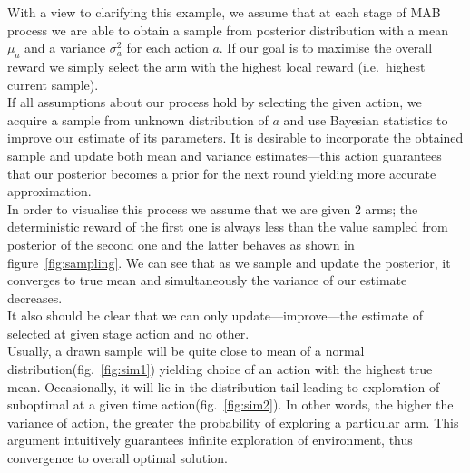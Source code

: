 \documentclass[12pt, a4paper, pdflatex, leqno, twoside]{report}
\begin{document}
With a view to clarifying this example, we assume that at each stage of MAB process we are able to 
obtain a sample from posterior distribution with a mean $\mu_a$ and a variance 
$\sigma^2_a$ for each action $a$. If our goal is to maximise the overall reward we simply 
select the arm with the highest local reward (i.e.\ highest current sample).\\

If all assumptions 
about our process hold by selecting the given action, we acquire a sample from unknown distribution of $a$ and use Bayesian statistics to improve our estimate of its 
parameters. It is desirable to incorporate the obtained sample and update both mean and 
variance estimates---this action guarantees that our posterior becomes a prior for the next round yielding more accurate approximation.\\

In order to visualise this process we assume that we are given 2 arms; the deterministic reward of the
first one is always less than the value sampled from posterior of the second one and the latter behaves as shown 
in figure~\ref{fig:sampling}. We can see that as we sample and update the 
posterior, it converges to true mean and simultaneously the variance of our 
estimate decreases.\\
It also should be clear that we can only update---improve---the estimate of 
selected at given stage action and no other.\\

Usually, a drawn sample will be quite close to mean of a normal distribution(fig.\ \ref{fig:sim1}) yielding choice of an action with the highest true mean. Occasionally, it will 
lie in the distribution tail leading to exploration of suboptimal at a given time 
action(fig.\ \ref{fig:sim2}). In other words, the higher the variance of action, the 
greater the probability of exploring a particular arm. This argument intuitively 
guarantees infinite exploration of environment, thus convergence to overall 
optimal solution.
\end{document}
